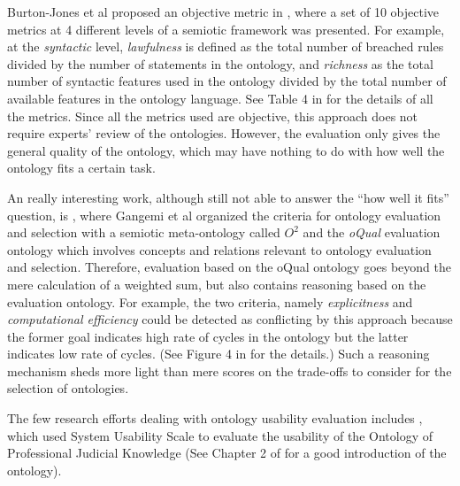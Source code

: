 Burton-Jones et al proposed an objective metric in \cite{burton2005semiotic}, where a set of 10 objective metrics at 4 different levels of a semiotic framework was presented. For example, at the \emph{syntactic} level, \emph{lawfulness} is defined as the total number of breached rules divided by the number of statements in the ontology, and \emph{richness} as the total number of syntactic features used in the ontology divided by the total number of available features in the ontology language. See Table 4 in \cite{burton2005semiotic} for the details of all the metrics. Since all the metrics used are objective, this approach does not require experts' review of the ontologies. However, the evaluation only gives the general quality of the ontology, which may have nothing to do with how well the ontology fits a certain task.

An really interesting work, although still not able to answer the ``how well it fits'' question, is \cite{gangemi2006qood}, where Gangemi et al organized the criteria for ontology evaluation and selection with a semiotic meta-ontology called $O^2$ and the \emph{oQual} evaluation ontology which involves concepts and relations relevant to ontology evaluation and selection. Therefore, evaluation based on the oQual ontology goes beyond the mere calculation of a weighted sum, but also contains reasoning based on the evaluation ontology. For example, the two criteria, namely \emph{explicitness} and \emph{computational efficiency} could be detected as conflicting by this approach because the former goal indicates high rate of cycles in the ontology but the latter indicates low rate of cycles. (See Figure 4 in \cite{gangemi2006qood} for the details.) Such a reasoning mechanism sheds more light than mere scores on the trade-offs to consider for the selection of ontologies.

The few research efforts dealing with ontology usability evaluation includes \cite{casellas2009ontology}, which used System Usability Scale \cite{brooke1996sus} to evaluate the usability of the Ontology of Professional Judicial Knowledge (See Chapter 2 of \cite{casellas2009ontology} for a good introduction of the ontology).

